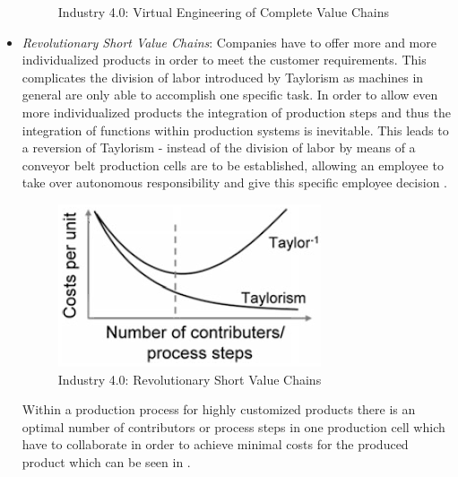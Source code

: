 \begin{itemize}
\begin{figure}[h!]
\centering
\caption{Industry 4.0: Virtual Engineering of Complete Value Chains \cite{IN4HYPO}}
\label{fig:2.3}
\end{figure}
\item \textit{Revolutionary Short Value Chains}: Companies have to offer more and more individualized products in order to meet the customer requirements. This complicates the division of labor introduced by Taylorism as machines in general are only able to accomplish one specific task. In order to allow even more individualized products the integration of production steps and thus the integration of functions within production systems is inevitable. This leads to a reversion of Taylorism - instead of the division of labor by means	of a conveyor belt production cells are to be established, allowing an employee to take over autonomous responsibility and give this specific employee decision \cite{IN4HYPO}. 

\begin{figure}[h!]
	\includegraphics[scale=0.5]{./gfx/revvalchain}
	\centering
	\caption{Industry 4.0: Revolutionary Short Value Chains \cite{IN4HYPO}}
	\label{fig:2.4}
\end{figure}

Within a production process for highly customized products there is an optimal number of contributors or process steps in one production cell which have to collaborate in order to achieve minimal costs for the produced product which can be seen in  \cite{IN4HYPO}.


\end{itemize}
